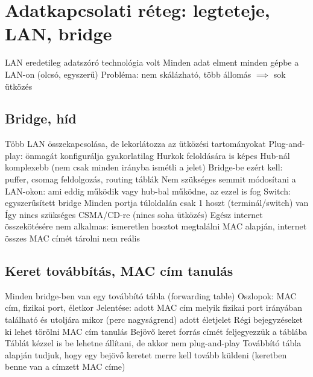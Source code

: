 \documentclass[12pt,a4paper]{article}
\begin{document}
\pagebreak

\section{Adatkapcsolati réteg: legteteje, LAN, bridge}

\begin{outline}
	\1 LAN eredetileg adatszóró technológia volt
		\2 Minden adat elment minden gépbe a LAN-on (olcsó, egyszerű)
		\2 Probléma: nem skálázható, több állomás $\implies$ sok ütközés
\end{outline}

\subsection{Bridge, híd}

\begin{outline}
	\1 Több LAN összekapcsolása, de lekorlátozza az ütközési tartományokat
		\2 Plug-and-play: önmagát konfigurálja gyakorlatilag
		\2 Hurkok feloldására is képes
	\1 Hub-nál komplexebb (nem csak minden irányba ismétli a jelet)
		\2 Bridge-be ezért kell: puffer, csomag feldolgozás, routing táblák
	\1 Nem szükséges semmit módosítani a LAN-okon: ami eddig működik vagy hub-bal működne, az ezzel is fog
	\1 Switch: egyszerűsített bridge
		\2 Minden portja túloldalán csak 1 hoszt (terminál/switch) van
		\2 Így nincs szükséges CSMA/CD-re (nincs soha ütközés)
	\1 Egész internet összekötésére nem alkalmas: ismeretlen hosztot megtalálni MAC alapján, internet összes MAC címét tárolni nem reális
\end{outline}

\subsection{Keret továbbítás, MAC cím tanulás}

\begin{outline}
	\1 Minden bridge-ben van egy továbbító tábla (forwarding table)
		\2 Oszlopok: MAC cím, fizikai port, életkor
		\2 Jelentése: adott MAC cím melyik fizikai port irányában található és utoljára mikor (perc nagyságrend) adott életjelet
		\2 Régi bejegyzéseket ki lehet törölni
	\1 MAC cím tanulás
		\2 Bejövő keret forrás címét feljegyezzük a táblába
		\2 Táblát kézzel is be lehetne állítani, de akkor nem plug-and-play
	\1 Továbbító tábla alapján tudjuk, hogy egy bejövő keretet merre kell tovább küldeni (keretben benne van a címzett MAC címe)
\end{outline}
\end{document}
